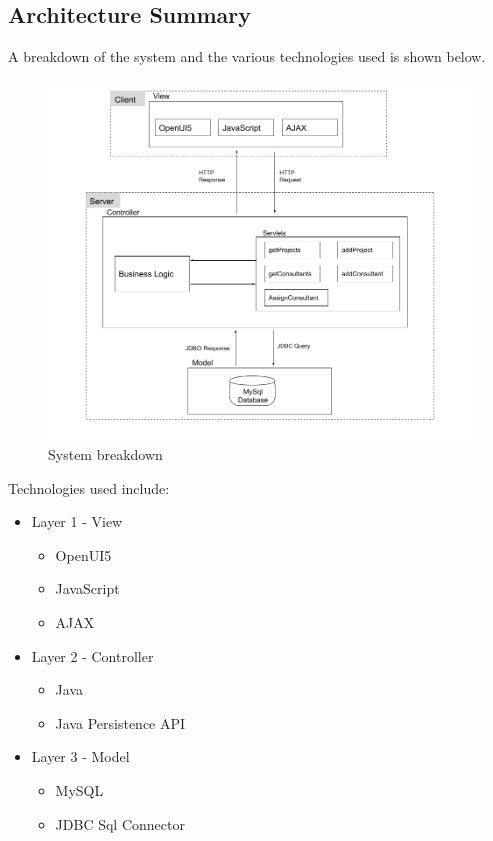 \documentclass[a4paper, 12pt, oneside]{article}
\begin{document}
\newpage
\subsection{Architecture Summary}
A breakdown of the system and the various technologies used is shown below.
\newline
\begin{figure}[h!]
\includegraphics[width = \linewidth]{images/summary.png}
	\caption{System breakdown}
\end{figure}
\newline
Technologies used include:
\begin{itemize}
	\item Layer 1 - View
	\begin{itemize}
		\item OpenUI5
		\item JavaScript
		\item AJAX
	\end{itemize}
	\item Layer 2 - Controller
	\begin{itemize}
		\item Java
		\item Java Persistence API
	\end{itemize}
	\item Layer 3 - Model 
	\begin{itemize}
		\item MySQL
		\item JDBC Sql Connector
	\end{itemize}
\end{itemize}
\end{document}
